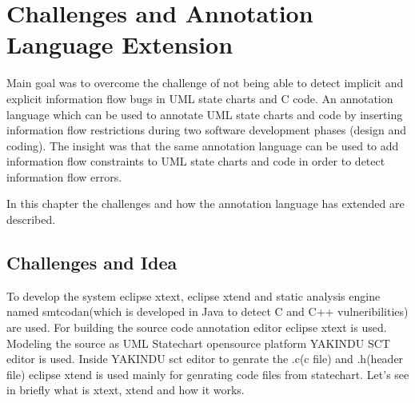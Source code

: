 \chapter{ Challenges and Annotation Language Extension}
Main goal was to overcome the challenge of not being able
to detect implicit and explicit information flow bugs in UML
state charts and C code. An annotation language
which can be used to annotate UML state charts and code by inserting information flow
restrictions during two software development phases (design
and coding). The insight was that the same annotation language
can be used to add information flow constraints to UML state
charts and code in order to detect information flow errors.
 
In this chapter the challenges and how the annotation language has extended are described.

\section{Challenges and Idea}

To develop the system eclipse xtext, eclipse xtend and static analysis engine named smtcodan(which is developed in Java to detect C and C++ vulneribilities) are used. For building the source code annotation editor eclipse xtext is used. Modeling the source as UML Statechart opensource platform YAKINDU SCT editor is used. Inside YAKINDU sct editor to genrate the .c(c file) and .h(header file) eclipse xtend is used mainly for genrating code files from statechart. Let's see in briefly what is xtext, xtend and how it works.

